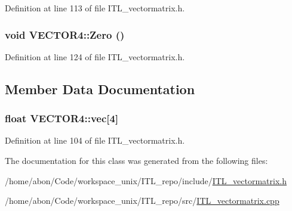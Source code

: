 Definition at line 113 of file ITL\_\-vectormatrix.h.

\hypertarget{classVECTOR4_ae4abada9a971655104a512e54b7cba2d}{
\subsubsection[{Zero}]{\setlength{\rightskip}{0pt plus 5cm}void VECTOR4::Zero ()}}
\label{classVECTOR4_ae4abada9a971655104a512e54b7cba2d}


Definition at line 124 of file ITL\_\-vectormatrix.h.



\subsection{Member Data Documentation}
\hypertarget{classVECTOR4_a7dca1ecb9f6b6572df7b15abc1b882cb}{
\subsubsection[{vec}]{\setlength{\rightskip}{0pt plus 5cm}float {\bf VECTOR4::vec}\mbox{[}4\mbox{]}}}
\label{classVECTOR4_a7dca1ecb9f6b6572df7b15abc1b882cb}


Definition at line 104 of file ITL\_\-vectormatrix.h.



The documentation for this class was generated from the following files:\begin{DoxyCompactItemize}
\item 
/home/abon/Code/workspace\_\-unix/ITL\_\-repo/include/\hyperlink{ITL__vectormatrix_8h}{ITL\_\-vectormatrix.h}\item 
/home/abon/Code/workspace\_\-unix/ITL\_\-repo/src/\hyperlink{ITL__vectormatrix_8cpp}{ITL\_\-vectormatrix.cpp}\end{DoxyCompactItemize}
